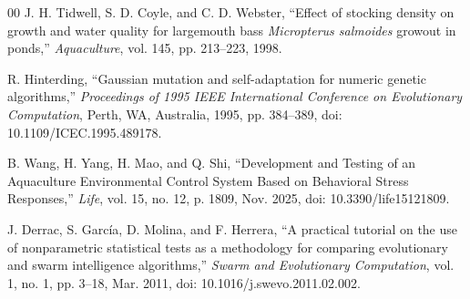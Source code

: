\documentclass[conference]{IEEEtran}
\begin{document}
\begin{thebibliography}{00}
 J. H. Tidwell, S. D. Coyle, and C. D. Webster, ``Effect of stocking density on growth and water quality for largemouth bass \textit{Micropterus salmoides} growout in ponds,'' \textit{Aquaculture}, vol. 145, pp. 213--223, 1998.

 R. Hinterding, ``Gaussian mutation and self-adaptation for numeric genetic algorithms,'' \textit{Proceedings of 1995 IEEE International Conference on Evolutionary Computation}, Perth, WA, Australia, 1995, pp. 384--389, doi: 10.1109/ICEC.1995.489178.

 B. Wang, H. Yang, H. Mao, and Q. Shi, ``Development and Testing of an Aquaculture Environmental Control System Based on Behavioral Stress Responses,'' \textit{Life}, vol. 15, no. 12, p. 1809, Nov. 2025, doi: 10.3390/life15121809.

 J. Derrac, S. García, D. Molina, and F. Herrera, ``A practical tutorial on the use of nonparametric statistical tests as a methodology for comparing evolutionary and swarm intelligence algorithms,'' \textit{Swarm and Evolutionary Computation}, vol. 1, no. 1, pp. 3--18, Mar. 2011, doi: 10.1016/j.swevo.2011.02.002.

\end{thebibliography}
\end{document}
